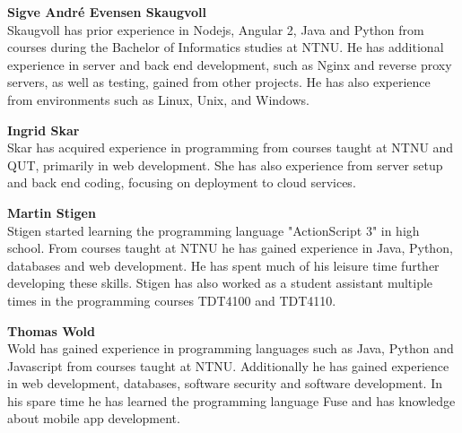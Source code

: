 \textbf{Sigve André Evensen Skaugvoll} \\
Skaugvoll has prior experience in Nodejs, Angular 2, Java and Python from courses during the Bachelor of Informatics studies at NTNU. He has additional experience in server and back end development, such as Nginx and reverse proxy servers, as well as testing, gained from other projects. He has also experience from environments such as Linux, Unix, and Windows.

\textbf{Ingrid Skar} \\
Skar has acquired experience in programming from courses taught at NTNU and QUT, primarily in web development. She has also experience from server setup and back end coding, focusing on deployment to cloud services.

\textbf{Martin Stigen} \\
Stigen started learning the programming language "ActionScript 3" in high school. From courses taught at NTNU he has gained experience in Java, Python, databases and web development. He has spent much of his leisure time further developing these skills. Stigen has also worked as a student assistant multiple times in the programming courses TDT4100 and TDT4110.

\textbf{Thomas Wold} \\
Wold has gained experience in programming languages such as Java, Python and Javascript from courses taught at NTNU. Additionally he has gained experience in web development, databases, software security and software development. In his spare time he has learned the programming language Fuse and has knowledge about mobile app development.

\cleardoublepage